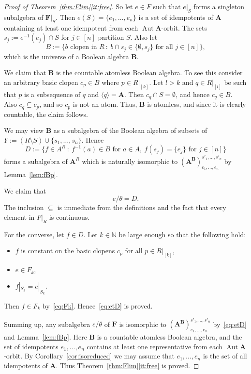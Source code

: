\documentclass[12pt,a4paper,reqno]{amsart}
\numberwithin{equation}{section}
\theoremstyle{plain}
\theoremstyle{definition}
\newcommand{\A}{\mathbf{A}}
\newcommand{\B}{\mathbf{B}}
\newcommand{\F}{\mathbf{F}}
\newcommand{\N}{\mathbb{N}}
\DeclareMathOperator{\Aut}{Aut}
\newcommand{\st}{\: :\:}
\begin{document}
\begin{proof}[Proof of Theorem~\ref{thm:Flim}\eqref{it:free}]
 So let $e\in F$ such that $e|_{S}$ forms a singleton subalgebra of $\F|_{S}$.
 Then $e(S)= \{e_1,\dots,e_n\}$ is a set of idempotents of $\A$ containing at least one idempotent from each $\Aut\A$-orbit.
 The sets $s_j := e^{-1}(e_j)\cap S$ for $j\in [n]$ partition $S$. Also let
\[ B := \{ b \text{ clopen in } R \st b\cap s_j \in \{\emptyset, s_j\} \text{ for all } j\in [n] \}, \]
which is the universe of a Boolean algebra $\B$.

 
 We claim that $\B$ is the countable atomless Boolean algebra.
To see this consider an arbitrary basic clopen $c_p\in B$ where $p\in R|_{[k]}$.
Let $l>k$ and $q\in R|_{[l]}$ be such that $p$ is a subsequence of $q$ and $\langle q\rangle=\A$.
Then $c_q\cap S=\emptyset$, and hence $c_q\in B$. Also $c_q\subsetneq c_p$, and so $c_p$ is not an atom.
Thus, $\B$ is atomless, and since it is clearly countable, the claim follows.
 
 We may view $\B$ as a subalgebra of the Boolean algebra of subsets of $Y := (R\setminus S) \cup \{s_1,\dots,s_n \}$. Hence
\[ D :=  \{ f\in A^R \st f^{-1}(a)\in B \text{ for } a\in A,\ f(s_j) = \{ e_j\} \text{ for } j\in [n]  \} \]
 forms a subalgebra of $\A^R$ which is naturally isomorphic to $(\A^\B)^{s'_1,\dots,s'_n}_{e_1,\dots,e_n}$ by
 Lemma~\ref{lem:fBp}. 

 We claim that 
\begin{equation} \label{eq:etD}
 e/\theta = D.
\end{equation}
 The inclusion $\subseteq$ is immediate from the definitions and the fact that every element in $F|_R$ is continuous.
 
 For the converse, let $f\in D$. 
Let $k\in\N$ be large enough so that the following hold:
\begin{itemize} 
\item \label{it:fc} $f$ is constant on the basic clopens $c_p$ for all $p\in R|_{[k]}$,
\item \label{it:eFK} $e\in F_k$,
\item $f|_{S_k} = e|_{S_k}$.
\end{itemize}
 Then $f\in F_k$ by~\eqref{eq:Fk}. Hence~\eqref{eq:etD} is proved.

 Summing up, any subalgebra $e/\theta$ of $\F$ is isomorphic to $(\A^\B)^{s'_1,\dots,s'_n}_{e_1,\dots,e_n}$ by~\eqref{eq:etD}
 and Lemma~\ref{lem:fBp}. Here $\B$ is a countable atomless Boolean algebra, and
 the set of idempotents $e_1,\dots,e_n$ contains at least one representative from each $\Aut\A$-orbit.
 By Corollary~\ref{cor:isoreduced} we may assume that $e_1,\dots,e_n$ is the set of all idempotents of $\A$.
 Thus Theorem~\ref{thm:Flim}\eqref{it:free} is proved. 
\end{proof} 
\end{document}
